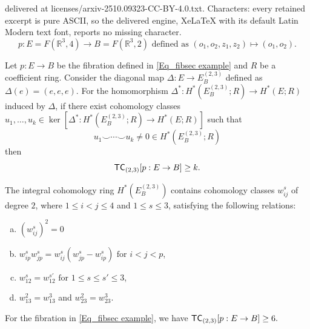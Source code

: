 \documentclass[10pt,a4paper]{amsart}
\newcommand{\TC}{{\sf {TC}}}
\newcommand{\rr}{{\mathbb {R}}}
\begin{document}
delivered at licenses/arxiv-2510.09323-CC-BY-4.0.txt. Characters: every retained excerpt is pure ASCII, so the delivered engine, XeLaTeX with its default Latin Modern text font, reports no missing character.
\begin{equation}\label{Eq_fibsec example}
p: E=F(\rr^3, 4) \to B=F(\rr^3, 2) \text{ defined as } (o_1, o_2, z_1, z_2)\mapsto (o_1, o_2).
\end{equation}

\begin{proposition}\label{Prop_cup product example}
Let $p\colon E\to B$ be the fibration defined in \eqref{Eq_fibsec example} and $R$ be a coefficient ring. Consider the diagonal map $\Delta : E \to E^{(2, 3)}_B$ defined as $\Delta(e)= (e, e, e)$. For the homomorphism $\Delta^\ast: H^\ast(E^{(2, 3)}_B;R) \to H^\ast(E;R)$ induced by $\Delta$, if there exist cohomology classes $u_1, \ldots, u_k \in \ker[\Delta^* : H^\ast(E^{(2, 3)}_B;R) \to H^*(E; R)]$ such that $$u_1 \smile \cdots \smile u_k \neq 0 \in H^\ast(E^{(2, 3)}_B;R)$$ then $$\TC_{(2, 3)}[p: E \to B] \geq k.$$ 
\end{proposition}

\begin{proposition}\label{Prop_cohom ring E23}
The integral cohomology ring $H^*(E_B^{(2,3)})$ contains cohomology classes $w^s_{ij}$ of degree $2$, where $1\leq i < j \leq 4$ and $1\leq s \leq 3$, satisfying the following relations:
\begin{enumerate}[(a)]
\item $(w^s_{ij})^2=0$
\item $w^s_{ip} w^s_{jp}= w^s_{ij} (w^s_{jp} - w^s_{ip}) \text{ for } i<j<p$,
\item $w^s_{12} = w^{s'}_{12} \text{ for } 1\leq s \leq s' \leq 3$,
\item $w^2_{13}=w^3_{13}$ and $w^2_{23}=w^3_{23}$.
\end{enumerate}
\end{proposition}

\begin{proposition}
For the fibration in \ref{Eq_fibsec example}, we have $\TC_{(2, 3)}[p: E \to B] \geq 6.$
\end{proposition}
\end{document}
